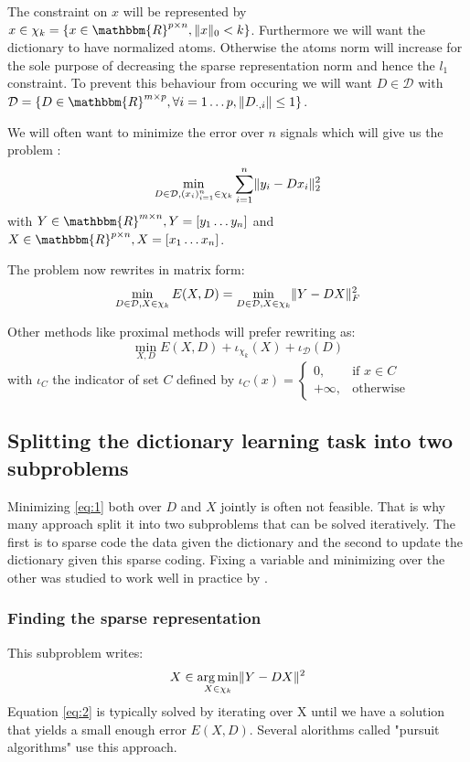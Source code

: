 \documentclass[a4paper,11pt]{article}
\newcommand{\RR}{\mathbbm{R}} %
\DeclarePairedDelimiter\norm{\lVert}{\rVert} %
\DeclareMathOperator*{\argmin}{arg\,min} %
\begin{document}
The constraint on $x$ will be represented by $x \in \chi_k = \{ x \in \RR^{p \times n}, \norm{x}_0<k \}$.
Furthermore we will want the dictionary to have normalized atoms.
Otherwise the atoms norm will increase for the sole purpose of decreasing the sparse representation norm and hence the $l_1$ constraint.
To prevent this behaviour from occuring we  will want $ D \in \mathcal{D} $ with $\mathcal{D} = \{ D \in \RR^{m \times p}, \forall i=1 \ldots p, \norm{D_{\cdot,i}} \leq 1 \}$.

We will often want to minimize the error over $n$ signals which will give us the problem :
$$\min\limits_{D \in \mathcal{D}, (x_i)_{i=1}^n \in \chi_k} \sum\limits_{i=1}^n \norm{y_i - Dx_i}_2^2$$
with $Y \in \RR^{m \times n}, Y = [y_1 \ldots y_n]$ and $X \in \RR^{p \times n}, X = [x_1 \ldots x_n]$.

The problem now rewrites in matrix form:
\begin{equation} \label{eq:1}
\min\limits_{D \in \mathcal{D}, X \in \chi_k} E(X,D) = \min\limits_{D \in \mathcal{D}, X \in \chi_k} \norm{Y - DX}_F^2
\end{equation}

Other methods like proximal methods will prefer rewriting \label{eq:1} as:
$$\min_{X, D} E(X,D) + \iota_{\chi_k}(X) + \iota_{\mathcal{D}}(D)$$
with $\iota_C$ the indicator of set $C$ defined by
$ \iota_C(x) =
\begin{cases}
0, & \text{if } x \in C\\
+ \infty, & \text{otherwise}
\end{cases}
$

\subsection{Splitting the dictionary learning task into two subproblems}
Minimizing \ref{eq:1} both over $D$ and $X$ jointly is often not feasible.
That is why many approach split it into two subproblems that can be solved iteratively.
The first is to sparse code the data given the dictionary and the second to update the dictionary given this sparse coding. Fixing a variable and minimizing over the other was studied to work well in practice by \cite{lee06}.

\subsubsection{Finding the sparse representation}
This subproblem writes:
\begin{equation} \label{eq:2}
X \in \argmin_{X \in \chi_k} \norm{Y - DX}^2
\end{equation}
Equation \ref{eq:2} is typically solved by iterating over X until we have a solution that yields a small enough error $E(X,D)$.
Several alorithms called "pursuit algorithms" use this approach.
\end{document}
